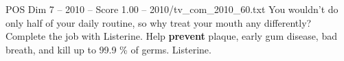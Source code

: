 \begin{textsample}{POS Dim 7 – 2010 – Score 1.00 – 2010/tv\_com\_2010\_60.txt}  \label{ex:f7_pos_080}
You wouldn't do only half of your daily routine, so why treat your mouth any differently?
Complete the job with Listerine.
Help \textbf{prevent} plaque, early gum disease, bad breath, and kill up to 99.9 \% of germs.
Listerine.

\end{textsample}
